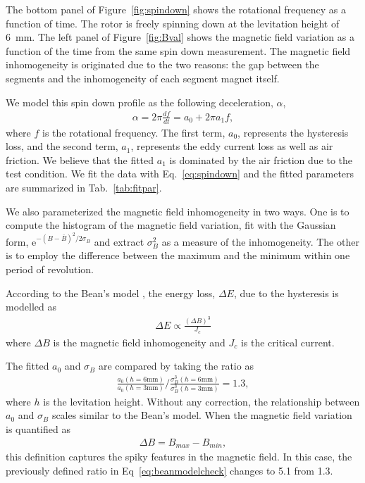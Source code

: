 \documentclass[journal]{IEEEtran}
\begin{document}
The bottom panel of Figure~\ref{fig:spindown} shows the rotational frequency as a function of time.
The rotor is freely spinning down at the levitation height of 6~mm.
The left panel of Figure~\ref{fig:Bval} shows the magnetic field variation as a function of the time from the same spin down measurement.
The magnetic field inhomogeneity is originated due to the two reasons: the gap between the segments and the inhomogeneity of each segment magnet itself.

We model this spin down profile as the following deceleration, $\alpha$,
\begin{eqnarray}
\alpha = 2\pi \frac{df}{dt} = a_0 + 2\pi a_1 f,
\label{eq:spindown}
\end{eqnarray}
where $f$ is the rotational frequency\cite{hull_review}.
The first term, $a_0$, represents the hysteresis loss, and the second term, $a_1$, represents the eddy current loss as well as air friction.
We believe that the fitted $a_1$ is dominated by the air friction due to the test condition.
We fit the data with Eq.~\ref{eq:spindown} and the fitted parameters are summarized in Tab.~\ref{tab:fitpar}.

We also parameterized the magnetic field inhomogeneity in two ways.
One is to compute the histogram of the magnetic field variation, fit with the Gaussian form, e$^{-(B-\bar{B})^2/2\sigma_B}$ and extract $\sigma_B^2$ as a measure of the inhomogeneity.
The other is to employ the difference between the maximum and the minimum within one period of revolution.

According to the Bean's model \cite{beans_model_1,beans_model_2}, the energy loss, $\Delta E$, due to the hysteresis is modelled as
\begin{eqnarray}
\Delta E \propto \frac{(\Delta B)^3}{J_c}
\label{eq:bean}
\end{eqnarray}
where $\Delta B$ is the magnetic field inhomogeneity and $J_c$ is the critical current.

The fitted $a_0$ and $\sigma_B$ are compared by taking the ratio as
\begin{eqnarray}
\frac{a_0(h=6\mbox{mm})}{a_0(h=3\mbox{mm})} / \frac{\sigma^3_B(h=6\mbox{mm})}{\sigma^3_B(h=3\mbox{mm})} = 1.3,
\label{eq:beanmodelcheck}
\end{eqnarray}
where $h$ is the levitation height.
Without any correction, the relationship between $a_0$ and $\sigma_B$ scales similar to the Bean's model.
When the magnetic field variation is quantified as
\begin{eqnarray}
\Delta B = B_{max} - B_{min},
\label{eq:bmax-bmin}
\end{eqnarray}
this definition captures the spiky features in the magnetic field.
In this case, the previously defined ratio in Eq~\ref{eq:beanmodelcheck} changes to 5.1 from 1.3.
\end{document}
